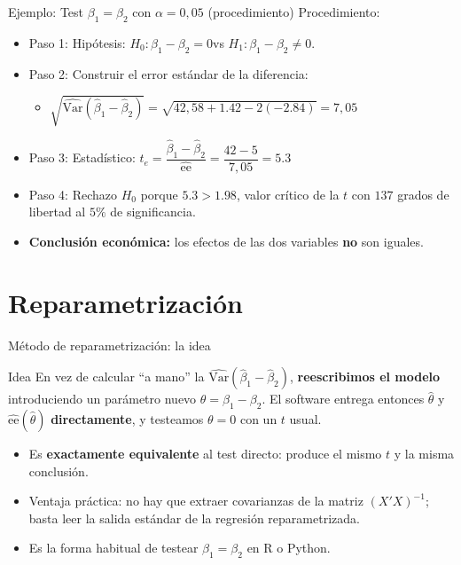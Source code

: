 \documentclass{beamer}
\begin{document}
\begin{frame}{Ejemplo: Test $\beta_1 = \beta_2$ con $\alpha = 0{,}05$ (procedimiento)}
Procedimiento:
        \begin{itemize}
            \item Paso 1: Hipótesis: $H_0: \beta_1 - \beta_2 = 0$\quad vs\quad
            $H_1: \beta_1 - \beta_2 \neq 0$.
            \item Paso 2: Construir el error estándar de la diferencia:
            \begin{itemize}
                \item $\sqrt{\hat{\text{Var}}(\hat{\beta}_1 - \hat{\beta}_2)} = \sqrt{42{,}58 + 1{.}42 - 2(-2{.}84)} = 7{,}05$
            \end{itemize}
            \item Paso 3: Estadístico: $t_e = \dfrac{\hat{\beta}_1-\hat{\beta}_2}{\widehat{\text{ee}}} = \dfrac{42 - 5}{7{,}05} = 5{.}3$
            \item Paso 4: Rechazo $H_0$ porque $5{.}3 > 1{.}98$, valor crítico de la $t$ con $137$ grados de libertad al $5\%$ de significancia.
            \item \textbf{Conclusión económica:} los efectos de las dos variables \textbf{no} son iguales.
        \end{itemize}
\end{frame}

\section{Reparametrización}

\begin{frame}{Método de reparametrización: la idea}
\begin{block}{Idea}
En vez de calcular ``a mano'' la $\hat{\text{Var}}(\hat{\beta}_1-\hat{\beta}_2)$, \textbf{reescribimos el modelo} introduciendo un parámetro nuevo $\theta=\beta_1-\beta_2$. El software entrega entonces $\hat{\theta}$ y $\widehat{\text{ee}}(\hat{\theta})$ \textbf{directamente}, y testeamos $\theta=0$ con un $t$ usual.
\end{block}
\pause
\begin{itemize}
    \item Es \textbf{exactamente equivalente} al test directo: produce el mismo $t$ y la misma conclusión.
    \item Ventaja práctica: no hay que extraer covarianzas de la matriz $(X'X)^{-1}$; basta leer la salida estándar de la regresión reparametrizada.
    \item Es la forma habitual de testear $\beta_1=\beta_2$ en R o Python.
\end{itemize}
\end{frame}
\end{document}
